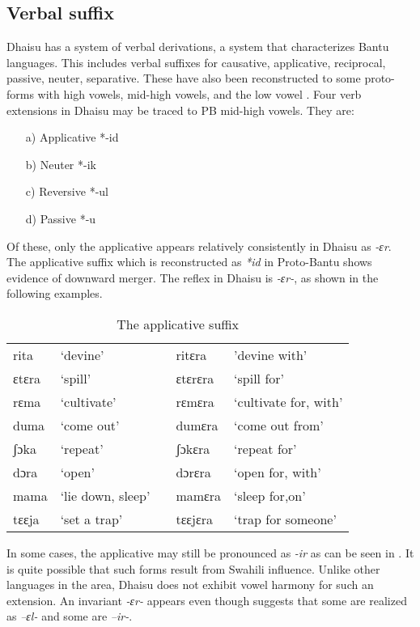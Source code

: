 \documentclass[output=paper,colorlinks,citecolor=brown]{langscibook}
\begin{document}
\subsection{Verbal suffix}\label{sec:ngonyani:4.2}

Dhaisu has a system of verbal derivations, a system that characterizes Bantu languages. This includes verbal suffixes for causative, applicative, reciprocal, passive, neuter, separative. These have also been reconstructed to some proto-forms with high vowels, mid-high vowels, and the low vowel \citep{Meeussen1967}. Four verb extensions in Dhaisu may be traced to PB mid-high vowels. They are:

\begin{enumerate}
    \item[a)] Applicative *-id
    \item[b)] Neuter *-ik
    \item[c)] Reversive *-ul
    \item[d)] Passive *-u
\end{enumerate}

Of these, only the applicative appears relatively consistently in Dhaisu as \textit{-ɛr}. The applicative suffix which is reconstructed as \textit{*id} in Proto-Bantu \cite[92]{Meeussen1967} shows evidence of downward merger. The reflex in Dhaisu is \textit{-ɛr-}, as shown in the following examples.

\begin{table}
    \caption{The applicative suffix}
    \label{tab:ngonyani:15}
    \begin{tabular}{@{}l l l l l@{}}
        rita &  `devine' & & ritɛra & 'devine with' \\
        ɛtɛra & `spill' & & ɛtɛrɛra & `spill for'\\
        rɛma & `cultivate' & & rɛmɛra & `cultivate for, with'\\
        duma & `come out' & & dumɛra & `come out from'\\
        ʃɔka & `repeat' & & ʃɔkɛra & `repeat for'\\
        dɔra & `open' & & dɔrɛra & `open for, with'\\
        mama & `lie down, sleep' & & mamɛra & `sleep for,on'\\
        tɛɛja & `set a trap' & & tɛɛjɛra & `trap for someone'\\
    \end{tabular}
\end{table}

In some cases, the applicative may still be pronounced as \textit{-ir} as can be seen in \cite[25]{RugemaliraEtAl2019}. It is quite possible that such forms result from Swahili influence. Unlike other languages in the area, Dhaisu does not exhibit vowel harmony for such an extension. An invariant \textit{-ɛr-} appears even though \cite[40]{Nurse2000} suggests that some are realized as \textit{–ɛl-} and some are \textit{–ir-}. 
\end{document}
